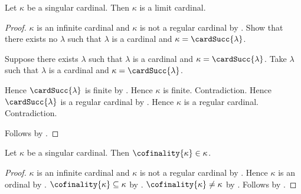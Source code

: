 \begin{theorem}\label{singular_cardinal_is_limit_cardinal}
    Let $\kappa$ be a singular cardinal.
    Then $\kappa$ is a limit cardinal.
\end{theorem}
\begin{proof}
    $\kappa$ is an infinite cardinal and $\kappa$ is not a regular cardinal
        by .
    Show that there exists no $\lambda$ such that
        $\lambda$ is a cardinal and $\kappa=\cardSucc{\lambda}$.
    \begin{subproof}
        Suppose there exists $\lambda$ such that
            $\lambda$ is a cardinal and $\kappa=\cardSucc{\lambda}$.
        Take $\lambda$ such that $\lambda$ is a cardinal and
            $\kappa=\cardSucc{\lambda}$.
        \begin{byCase}
                Hence $\cardSucc{\lambda}$ is finite
                    by .
                Hence $\kappa$ is finite.
                Contradiction.
                Hence $\cardSucc{\lambda}$ is a regular cardinal
                    by .
                Hence $\kappa$ is a regular cardinal.
                Contradiction.
        \end{byCase}
    \end{subproof}
    Follows by .
\end{proof}

\begin{proposition}\label{cofinality_belongs_to_singular_cardinal}
    Let $\kappa$ be a singular cardinal.
    Then $\cofinality{\kappa}\in\kappa$.
\end{proposition}
\begin{proof}
    $\kappa$ is an infinite cardinal and $\kappa$ is not a regular cardinal
        by .
    Hence $\kappa$ is an ordinal by .
    $\cofinality{\kappa}\subseteq\kappa$
        by .
    $\cofinality{\kappa}\neq\kappa$
        by .
    Follows by .
\end{proof}

